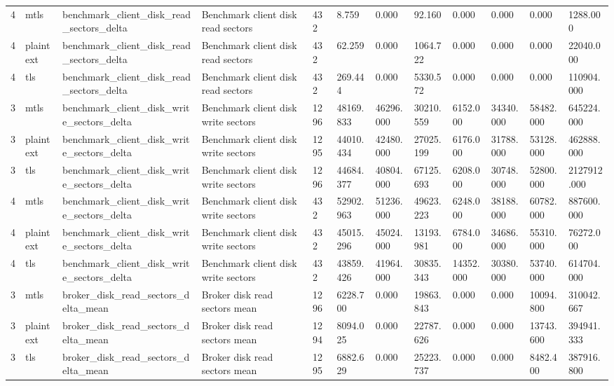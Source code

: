 \begin{longtable}{llllllllllll}
4 & mtls & benchmark\_client\_disk\_read\_sectors\_delta & Benchmark client disk read sectors & 432 & 8.759 & 0.000 & 92.160 & 0.000 & 0.000 & 0.000 & 1288.000 \\
4 & plaintext & benchmark\_client\_disk\_read\_sectors\_delta & Benchmark client disk read sectors & 432 & 62.259 & 0.000 & 1064.722 & 0.000 & 0.000 & 0.000 & 22040.000 \\
4 & tls & benchmark\_client\_disk\_read\_sectors\_delta & Benchmark client disk read sectors & 432 & 269.444 & 0.000 & 5330.572 & 0.000 & 0.000 & 0.000 & 110904.000 \\
3 & mtls & benchmark\_client\_disk\_write\_sectors\_delta & Benchmark client disk write sectors & 1296 & 48169.833 & 46296.000 & 30210.559 & 6152.000 & 34340.000 & 58482.000 & 645224.000 \\
3 & plaintext & benchmark\_client\_disk\_write\_sectors\_delta & Benchmark client disk write sectors & 1295 & 44010.434 & 42480.000 & 27025.199 & 6176.000 & 31788.000 & 53128.000 & 462888.000 \\
3 & tls & benchmark\_client\_disk\_write\_sectors\_delta & Benchmark client disk write sectors & 1296 & 44684.377 & 40804.000 & 67125.693 & 6208.000 & 30748.000 & 52800.000 & 2127912.000 \\
4 & mtls & benchmark\_client\_disk\_write\_sectors\_delta & Benchmark client disk write sectors & 432 & 52902.963 & 51236.000 & 49623.223 & 6248.000 & 38188.000 & 60782.000 & 887600.000 \\
4 & plaintext & benchmark\_client\_disk\_write\_sectors\_delta & Benchmark client disk write sectors & 432 & 45015.296 & 45024.000 & 13193.981 & 6784.000 & 34686.000 & 55310.000 & 76272.000 \\
4 & tls & benchmark\_client\_disk\_write\_sectors\_delta & Benchmark client disk write sectors & 432 & 43859.426 & 41964.000 & 30835.343 & 14352.000 & 30380.000 & 53740.000 & 614704.000 \\
3 & mtls & broker\_disk\_read\_sectors\_delta\_mean & Broker disk read sectors mean & 1296 & 6228.700 & 0.000 & 19863.843 & 0.000 & 0.000 & 10094.800 & 310042.667 \\
3 & plaintext & broker\_disk\_read\_sectors\_delta\_mean & Broker disk read sectors mean & 1294 & 8094.025 & 0.000 & 22787.626 & 0.000 & 0.000 & 13743.600 & 394941.333 \\
3 & tls & broker\_disk\_read\_sectors\_delta\_mean & Broker disk read sectors mean & 1295 & 6882.629 & 0.000 & 25223.737 & 0.000 & 0.000 & 8482.400 & 387916.800 \\

\end{longtable}
